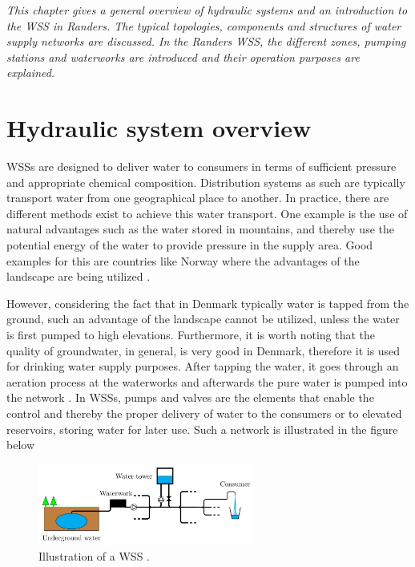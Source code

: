 \emph{This chapter gives a general overview of hydraulic systems and an introduction to the WSS in Randers. The typical topologies, components and structures of water supply networks are discussed. In the Randers WSS, the different zones, pumping stations and waterworks are introduced and their operation purposes are explained.}

\section{Hydraulic system overview}
\label{hydraulic_system_overview}

WSSs are designed to deliver water to consumers in terms of sufficient pressure and appropriate chemical composition. Distribution systems as such are typically transport water from one geographical place to another. In practice, there are different methods exist to achieve this water transport. One example is the use of natural advantages such as the water stored in mountains, and thereby use the potential energy of the water to provide pressure in the supply area. Good examples for this are countries like Norway where the advantages of the landscape are being utilized \cite{norway_mountains}. 

However, considering the fact that in Denmark typically water is tapped from the ground, such an advantage of the landscape cannot be utilized, unless the water is first pumped to high elevations. Furthermore, it is worth noting that the quality of groundwater, in general, is very good in Denmark, therefore it is used for drinking water supply purposes. After tapping the water, it goes through an aeration process at the waterworks and afterwards the pure water is pumped into the network \cite{prahata}. In WSSs, pumps and valves are the elements that enable the control and thereby the proper delivery of water to the consumers or to elevated reservoirs, storing water for later use. Such a network is illustrated in the figure below

\begin{figure}[H]
\centering
\includegraphics[width=0.63\textwidth]{report/pictures/WSS_illustration}
\caption{Illustration of a WSS \cite{kenneth_houe}.}
\label{fig:WSS_example}
\end{figure}

